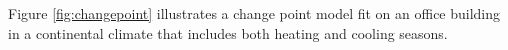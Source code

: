 

Figure \ref{fig:changepoint} illustrates a change point model fit on an office building in a continental climate that includes both heating and cooling seasons.